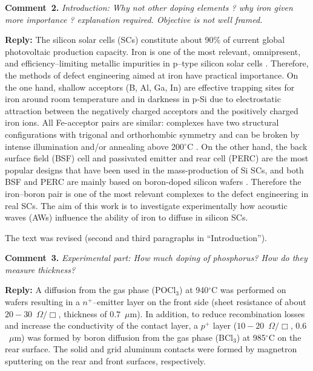 \documentclass[sn-mathphys]{sn-jnl}
\begin{document}
\vspace{1cm}
\noindent
\textcolor[rgb]{0.00,0.50,1.00}{\textbf{Comment~2.}}
\emph{Introduction: Why not other doping elements ?
 why iron given more importance ? explanation required. Objective is not well framed.}

\noindent
\textcolor[rgb]{0.51,0.00,0.00}{\textbf{Reply:}}
The silicon solar cells (SCs) constitute about 90\% of current global photovoltaic production capacity.
Iron is one of the most relevant, omnipresent, and efficiency--limiting metallic impurities
in p--type silicon solar cells \cite{Istratov1999,IronSC}.
Therefore, the methods of defect engineering aimed at iron have practical importance.
On the one hand, shallow acceptors (B, Al, Ga, In) are effective trapping sites for iron around room temperature
and in darkness in p-Si
due to electrostatic attraction between the negatively charged
acceptors and the positively charged iron ions.
All Fe-acceptor pairs are similar:
complexes have two structural configurations
with trigonal and orthorhombic symmetry and can be broken by
intense illumination and/or annealing above 200$^\circ$C \cite{Istratov1999,FeBKinAPL2013}.
On the other hand, the back surface field (BSF) cell and passivated emitter and rear cell (PERC)
are the most popular designs that have been used in the mass-production of Si SCs,
and both BSF and PERC are mainly  based on boron-doped silicon wafers \cite{SCRev2020,GreenRew2019}.
Therefore the iron--boron pair is one of the most relevant complexes to the defect engineering in real SCs.
The aim of this work is to investigate experimentally how acoustic waves (AWs) influence the ability of iron to diffuse in silicon SCs.

The text was revised
(second and third paragraphs in ``Introduction'').

\vspace{1cm}
\noindent
\textcolor[rgb]{0.00,0.50,1.00}{\textbf{Comment~3.}}
\emph{Experimental part: How much doping of phosphorus? How do they measure thickness?}

\noindent
\textcolor[rgb]{0.51,0.00,0.00}{\textbf{Reply:}}
A diffusion from the gas phase (POCl$_3$) at 940$^\circ$C was performed on wafers resulting in a $n^+$--emitter layer on
the front side (sheet resistance of about $20-30$~$\Omega/\Box$, thickness of $0.7$~$\mu$m).
In addition, to reduce recombination losses and increase the conductivity of the contact layer,
a $p^+$ layer ($10-20$~$\Omega/\Box$, $0.6$~$\mu$m) was formed by boron diffusion from
the gas phase (BCl$_3$) at 985$^\circ$C on the rear surface.
The solid and grid aluminum contacts were formed by magnetron sputtering on the rear and front surfaces, respectively.
\end{document}
